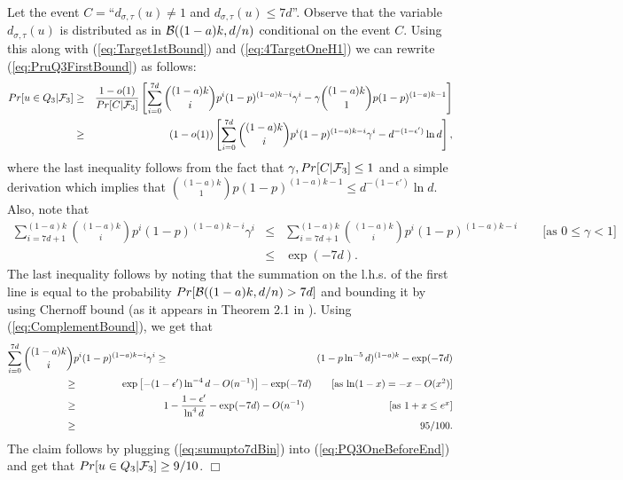 \documentclass[a4paper,10pt]{article}
\makeatletter
\newenvironment{claimproof}[1]{\noindent{\bf Proof of Claim #1\@:}}{\hfill $\Box$\\}
\makeatother
\begin{document}
\begin{claimproof}{\ref{Lemma:Q3}}
\noindent
Let the event $C=$``$d_{\sigma, \tau}(u) \neq 1$ and $d_{\sigma, \tau}(u)\leq 7d$''.
Observe that the variable $d_{\sigma, \tau}(u)$  is distributed as in ${\cal B}((1-a)k,d/n)$
conditional on the event $C$. Using this  along with 
(\ref{eq:Target1stBound}) and (\ref{eq:4TargetOneH1})
we can rewrite (\ref{eq:PruQ3FirstBound}) as follows:
\begin{eqnarray}
Pr[u \in Q_3|{\cal F}_3] &\geq & \frac{1-o(1)}{Pr[C|{\cal F}_3]}
\left [\sum_{i=0}^{7d}{(1-a)k \choose i}p^{i}(1-p)^{(1-a)k-i}\gamma^i
-\gamma{(1-a)k \choose 1}p(1-p)^{(1-a)k-1} \right]
\nonumber \\
&\geq & (1-o(1))
\left [\sum_{i=0}^{7d}
{(1-a)k \choose i}p^{i}(1-p)^{(1-a)k-i}\gamma^{i} -d^{-(1-\epsilon')} \ln d \right],
 \label{eq:PQ3OneBeforeEnd}
\end{eqnarray}
where the last inequality follows from the fact that $\gamma, Pr[C|{\cal F}_3]\leq 1$
and a simple derivation which implies that 
${(1-a)k \choose 1}p(1-p)^{(1-a)k-1}\leq d^{-(1-\epsilon')} \ln d$.
Also, note that
\begin{eqnarray}
\sum_{i=7d+1}^{(1-a)k}{(1-a)k \choose i}p^{i}(1-p)^{(1-a)k-i}\gamma^i&\leq &
\sum_{i=7d+1}^{(1-a)k}{(1-a)k \choose i}p^{i}(1-p)^{(1-a)k-i} \qquad \mbox{[as $0\leq \gamma <1$]}
\nonumber \\
&\leq& \exp\left(-7d\right).\label{eq:ComplementBound}
\end{eqnarray}
The last inequality follows by noting that the summation on the l.h.s. of the first line
is equal to the probability $Pr[{\cal B}((1-a)k,d/n)>7d]$ and  bounding it by using
Chernoff bound  (as it appears in Theorem 2.1 in \cite{janson}).
Using (\ref{eq:ComplementBound}), we get that
\begin{eqnarray}
\sum_{i=0}^{7d}{(1-a)k \choose i}p^{i}(1-p)^{(1-a)k-i}\gamma^{i}
&\geq&(1-p \ln^{-5}d )^{(1-a)k}-\exp(-7d)
\nonumber \\ 
&\hspace{-3.2cm}\geq &\hspace{-1.9cm}\exp\left[ -(1-\epsilon')\ln^{-4} d - O(n^{-1}) \right] -\exp(-7d)
 \qquad \mbox{[as $\ln(1-x)=-x-O(x^2)$]}
\nonumber \\ 
&\hspace{-3.2cm}\geq &\hspace{-1.9cm} 1-\frac{1-\epsilon'}{\ln^4 d}-\exp(-7d)-O(n^{-1})
\hspace{3cm} \mbox{[as $1+x\leq e^x$]} \nonumber
\nonumber \\
&\hspace{-3.2cm}\geq &\hspace{-1.9cm} 95/100. \label{eq:sumupto7dBin}
\end{eqnarray}
The claim follows by plugging (\ref{eq:sumupto7dBin}) into (\ref{eq:PQ3OneBeforeEnd}) and
get that $Pr[u \in Q_3|{\cal F}_3] \geq 9/10$.
\end{claimproof}
\end{document}
